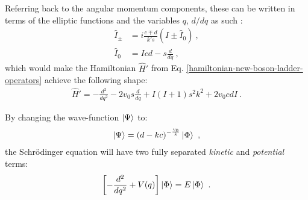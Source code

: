 Referring back to the angular momentum components, these can be written in terms of the elliptic functions and the variables $q$, $d/dq$ as such \cite{raduta2020new}:
\begin{align}
    \hat{I}_\pm&=i\frac{c\mp d}{k's}\left(I\pm\hat{I}_0\right)\ ,\nonumber\\
    \hat{I}_0&=Icd-s\frac{d}{dq}\ ,
    \label{angular-momentum-elliptic-representation}
\end{align}
which would make the Hamiltonian $\hat{H}'$ from Eq. \ref{hamiltonian-new-boson-ladder-operators} achieve the following shape:
\begin{align}
    \hat{H}'=-\frac{d^2}{dq^2}-2v_0s\frac{d}{dq}+I(I+1)s^2k^2+2v_0cdI\ .
    \label{boson-hamiltonian-complete-form}
\end{align}

By changing the wave-function $\ket{\Psi}$ to:
\begin{align}
    \ket{\Psi}=\left(d-kc\right)^{-\frac{v_0}{k}}\ket{\Phi}\ ,
\end{align}
the Schrödinger equation will have two fully separated \emph{kinetic} and \emph{potential} terms:
\begin{align}
    \left[-\frac{d^2}{dq^2}+V(q)\right]\ket{\Phi}=E\ket{\Phi}\ .
    \label{schrodinger-equation-elliptic}
\end{align}

